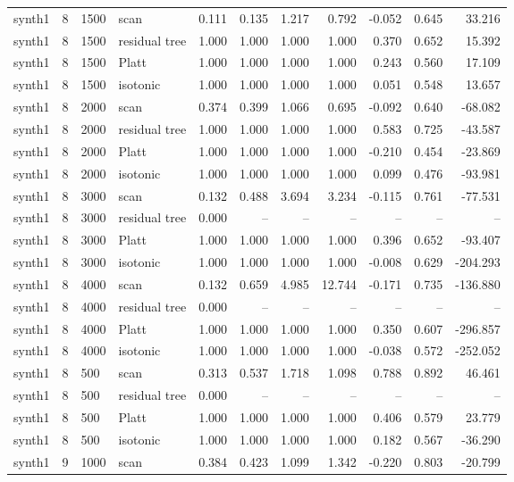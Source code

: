 \begin{tabular}{lrllrrrrrrr}
synth1 & 8 & 1500 & scan & 0.111 & 0.135 & 1.217 & 0.792 & -0.052 & 0.645 & 33.216 \\
synth1 & 8 & 1500 & residual tree & 1.000 & 1.000 & 1.000 & 1.000 & 0.370 & 0.652 & 15.392 \\
synth1 & 8 & 1500 & Platt & 1.000 & 1.000 & 1.000 & 1.000 & 0.243 & 0.560 & 17.109 \\
synth1 & 8 & 1500 & isotonic & 1.000 & 1.000 & 1.000 & 1.000 & 0.051 & 0.548 & 13.657 \\
synth1 & 8 & 2000 & scan & 0.374 & 0.399 & 1.066 & 0.695 & -0.092 & 0.640 & -68.082 \\
synth1 & 8 & 2000 & residual tree & 1.000 & 1.000 & 1.000 & 1.000 & 0.583 & 0.725 & -43.587 \\
synth1 & 8 & 2000 & Platt & 1.000 & 1.000 & 1.000 & 1.000 & -0.210 & 0.454 & -23.869 \\
synth1 & 8 & 2000 & isotonic & 1.000 & 1.000 & 1.000 & 1.000 & 0.099 & 0.476 & -93.981 \\
synth1 & 8 & 3000 & scan & 0.132 & 0.488 & 3.694 & 3.234 & -0.115 & 0.761 & -77.531 \\
synth1 & 8 & 3000 & residual tree & 0.000 & -- & -- & -- & -- & -- & -- \\
synth1 & 8 & 3000 & Platt & 1.000 & 1.000 & 1.000 & 1.000 & 0.396 & 0.652 & -93.407 \\
synth1 & 8 & 3000 & isotonic & 1.000 & 1.000 & 1.000 & 1.000 & -0.008 & 0.629 & -204.293 \\
synth1 & 8 & 4000 & scan & 0.132 & 0.659 & 4.985 & 12.744 & -0.171 & 0.735 & -136.880 \\
synth1 & 8 & 4000 & residual tree & 0.000 & -- & -- & -- & -- & -- & -- \\
synth1 & 8 & 4000 & Platt & 1.000 & 1.000 & 1.000 & 1.000 & 0.350 & 0.607 & -296.857 \\
synth1 & 8 & 4000 & isotonic & 1.000 & 1.000 & 1.000 & 1.000 & -0.038 & 0.572 & -252.052 \\
synth1 & 8 & 500 & scan & 0.313 & 0.537 & 1.718 & 1.098 & 0.788 & 0.892 & 46.461 \\
synth1 & 8 & 500 & residual tree & 0.000 & -- & -- & -- & -- & -- & -- \\
synth1 & 8 & 500 & Platt & 1.000 & 1.000 & 1.000 & 1.000 & 0.406 & 0.579 & 23.779 \\
synth1 & 8 & 500 & isotonic & 1.000 & 1.000 & 1.000 & 1.000 & 0.182 & 0.567 & -36.290 \\
synth1 & 9 & 1000 & scan & 0.384 & 0.423 & 1.099 & 1.342 & -0.220 & 0.803 & -20.799 \\

\end{tabular}
